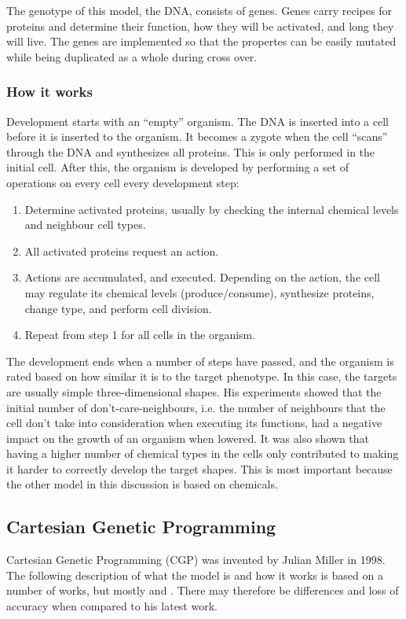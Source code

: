The genotype of this model, the DNA, consists of genes. Genes carry recipes for proteins and determine their function, how they will be activated, and long they will live. The genes are implemented so that the propertes can be easily mutated while being duplicated as a whole during cross over.

\subsubsection{How it works}
Development starts with an ``empty'' organism. The DNA is inserted into a cell before it is inserted to the organism. It becomes a zygote when the cell ``scans'' through the DNA and synthesizes all proteins. This is only performed in the initial cell. After this, the organism is developed by performing a set of operations on every cell every development step:

\begin{enumerate}
	\itemsep=0pt
	\item Determine activated proteins, usually by checking the internal chemical levels and neighbour cell types.
	\item All activated proteins request an action.
	\item Actions are accumulated, and executed. Depending on the action, the cell may regulate its chemical levels (produce/consume), synthesize proteins, change type, and perform cell division.
	\item Repeat from step 1 for all cells in the organism.
\end{enumerate}

The development ends when a number of steps have passed, and the organism is rated based on how similar it is to the target phenotype. In this case, the targets are usually simple three-dimensional shapes. His experiments showed that the initial number of don't-care-neighbours, i.e. the number of neighbours that the cell don't take into consideration when executing its functions, had a negative impact on the growth of an organism when lowered. It was also shown that having a higher number of chemical types in the cells only contributed to making it harder to correctly develop the target shapes. This is most important because the other model in this discussion is based on chemicals.


\subsection{Cartesian Genetic Programming}
Cartesian Genetic Programming (CGP) was invented by Julian Miller in 1998. The following description of what the model is and how it works is based on a number of works, but mostly \cite{mteurogp2000} and \cite{ecal2003}. There may therefore be differences and loss of accuracy when compared to his latest work.

